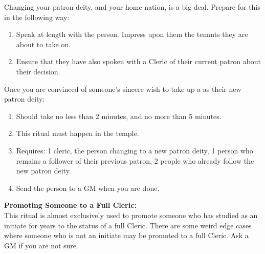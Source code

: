 \documentclass[green]{GL2020}
\begin{document}
Changing your patron deity, and your home nation, is a big deal. Prepare for this in the following way:
  \begin{enumerate}
    \item Speak at length with the person. Impress upon them the tenants they are about to take on.
    \item Ensure that they have also spoken with a Cleric of their current patron about their decision.
  \end{enumerate}

Once you are convinced of someone’s sincere wish to take up a \cTechGod{} as their new patron deity:
  \begin{enumerate}
    \item Should take no less than 2 minutes, and no more than 5 minutes.
    \item This ritual must happen in the temple.
    \item Requires: 1 cleric, the person changing to a new patron deity, 1 person who remains a follower of their previous patron, 2 people who already follow the new patron deity.
		\item Send the person to a GM when you are done.
  \end{enumerate}
   
\textbf{Promoting Someone to a Full Cleric:}\\
This ritual is almost exclusively used to promote someone who has studied as an initiate for years to the status of a full Cleric. There are some weird edge cases where someone who is not an initiate may be promoted to a full Cleric. Ask a GM if you are not sure.
\end{document}
